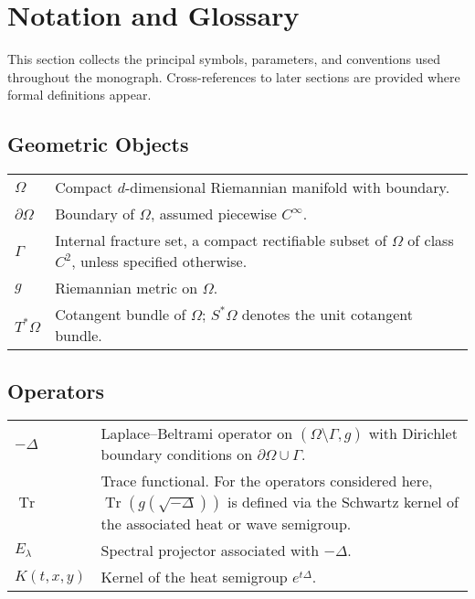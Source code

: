 
\chapter*{Notation and Glossary}
\label{chap:notation}

This section collects the principal symbols, parameters, and conventions
used throughout the monograph. Cross-references to later sections are
provided where formal definitions appear.

\section*{Geometric Objects}

\begin{longtable}{p{} p{}}
$\Omega$ & Compact $d$-dimensional Riemannian manifold with boundary. \\

$\partial\Omega$ & Boundary of $\Omega$, assumed piecewise $C^\infty$. \\

$\Gamma$ & Internal fracture set, a compact rectifiable subset of $\Omega$ of class $C^2$, unless specified otherwise. \\

$g$ & Riemannian metric on $\Omega$. \\

$T^*\Omega$ & Cotangent bundle of $\Omega$; $S^*\Omega$ denotes the unit cotangent bundle. \\
\end{longtable}

\section*{Operators}

\begin{longtable}{p{} p{}}
$-\Delta$ & Laplace–Beltrami operator on $(\Omega \setminus \Gamma, g)$ with Dirichlet boundary conditions on $\partial\Omega \cup \Gamma$. \\

$\operatorname{Tr}$ & Trace functional. For the operators considered here, $\operatorname{Tr}(g(\sqrt{-\Delta}))$ is defined via the Schwartz kernel of the associated heat or wave semigroup. \\

$E_\lambda$ & Spectral projector associated with $-\Delta$. \\

$K(t,x,y)$ & Kernel of the heat semigroup $e^{t\Delta}$. \\
\end{longtable}

